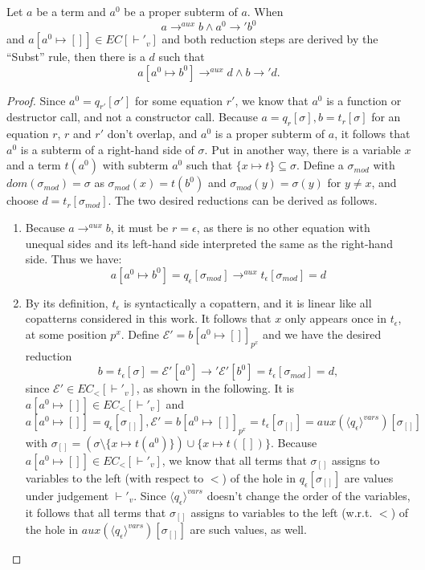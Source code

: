 \begin{lemma}
Let $a$ be a term and $a^0$ be a proper subterm of $a$. When
\[
a \longrightarrow^{aux} b \land a^0 \longrightarrow' b^0
\]
and $a[a^0 \mapsto []] \in EC[\vdash'_v]$ and both reduction steps are derived by the ``Subst'' rule, then there is a $d$ such that
\[
a[a^0 \mapsto b^0] \longrightarrow^{aux} d \land b \longrightarrow' d.
\]

\begin{proof}
Since $a^0 = q_{r'}[\sigma']$ for some equation $r'$, we know that $a^0$ is a function or destructor call, and not a constructor call. Because $a = q_r[\sigma], b = t_r[\sigma]$ for an equation $r$, $r$ and $r'$ don't overlap, and $a^0$ is a proper subterm of $a$, it follows that $a^0$ is a subterm of a right-hand side of $\sigma$. Put in another way, there is a variable $x$ and a term $t(a^0)$ with subterm $a^0$ such that $\{x \mapsto t\} \subseteq \sigma$. Define a $\sigma_{mod}$ with $dom(\sigma_{mod}) = \sigma$ as $\sigma_{mod}(x) = t(b^0)$ and $\sigma_{mod}(y) = \sigma(y)$ for $y \neq x$, and choose $d = t_r[\sigma_{mod}]$. The two desired reductions can be derived as follows.
\begin{enumerate}
\item Because $a \longrightarrow^{aux} b$, it must be $r = \epsilon$, as there is no other equation with unequal sides and its left-hand side interpreted the same as the right-hand side. Thus we have:
\[
a[a^0 \mapsto b^0] = q_\epsilon[\sigma_{mod}] \longrightarrow^{aux} t_\epsilon[\sigma_{mod}] = d
\]

\item By its definition, $t_\epsilon$ is syntactically a copattern, and it is linear like all copatterns considered in this work. It follows that $x$ only appears once in $t_\epsilon$, at some position $p^x$. Define $\mathcal{E}' = b[a^0 \mapsto []]_{p^x}$ and we have the desired reduction
\[
b = t_\epsilon[\sigma] = \mathcal{E}'[a^0] \longrightarrow' \mathcal{E}'[b^0] = t_\epsilon[\sigma_{mod}] = d,
\]
since $\mathcal{E}' \in EC_<[\vdash'_v]$, as shown in the following. It is $a[a^0 \mapsto []] \in EC_<[\vdash'_v]$ and
\[
a[a^0 \mapsto []] = q_\epsilon[\sigma_{[]}], \mathcal{E}' = b[a^0 \mapsto []]_{p^x} = t_\epsilon[\sigma_{[]}] = aux(\langle q_\epsilon \rangle^{vars})[\sigma_{[]}]
\]
with $\sigma_{[]} = (\sigma \setminus \{x \mapsto t(a^0)\}) \cup \{x \mapsto t([])\}$. Because $a[a^0 \mapsto []] \in EC_<[\vdash'_v]$, we know that all terms that $\sigma_{[]}$ assigns to variables to the left (with respect to $<$) of the hole in $q_\epsilon[\sigma_{[]}]$ are values under judgement $\vdash'_v$. Since $\langle q_\epsilon \rangle^{vars}$ doesn't change the order of the variables, it follows that all terms that $\sigma_{[]}$ assigns to variables to the left (w.r.t. $<$) of the hole in $aux(\langle q_\epsilon \rangle^{vars})[\sigma_{[]}]$ are such values, as well.

\end{enumerate}
\end{proof}
\end{lemma}

